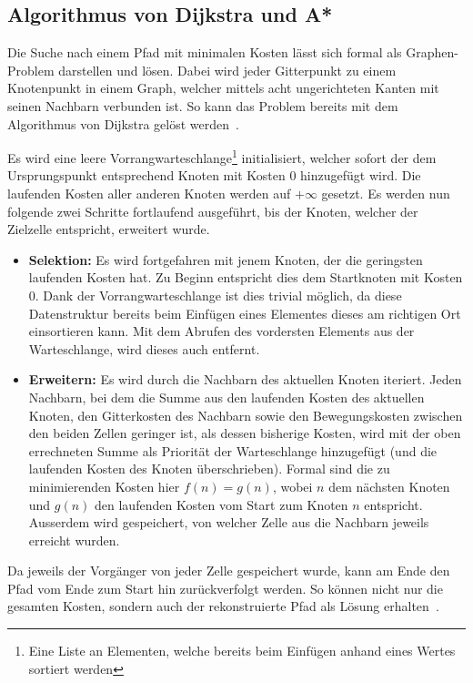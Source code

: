 \subsection{Algorithmus von Dijkstra und A*}

Die Suche nach einem Pfad mit minimalen Kosten lässt sich formal als Graphen-Problem darstellen und lösen. Dabei wird jeder Gitterpunkt zu einem Knotenpunkt in einem Graph, welcher mittels acht ungerichteten Kanten mit seinen Nachbarn verbunden ist. So kann das Problem bereits mit dem Algorithmus von Dijkstra gelöst werden~\cite{dijkstra1959note}.

Es wird eine leere Vorrangwarteschlange\footnote{Eine Liste an Elementen, welche bereits beim Einfügen anhand eines Wertes sortiert werden} initialisiert, welcher sofort der dem Ursprungspunkt entsprechend Knoten mit Kosten 0 hinzugefügt wird. Die laufenden Kosten aller anderen Knoten werden auf $+ \infty$ gesetzt. Es werden nun  folgende zwei Schritte fortlaufend ausgeführt, bis der Knoten, welcher der Zielzelle entspricht, erweitert wurde.~\cite{dijkstra1959note}
\begin{itemize}
  \item \textbf{Selektion:} Es wird fortgefahren mit jenem Knoten, der die geringsten laufenden Kosten hat. Zu Beginn entspricht dies dem Startknoten mit Kosten 0. Dank der Vorrangwarteschlange ist dies trivial möglich, da diese Datenstruktur bereits beim Einfügen eines Elementes dieses am richtigen Ort einsortieren kann. Mit dem Abrufen des vordersten Elements aus der Warteschlange, wird dieses auch entfernt.~\cite{dijkstra1959note}
  \item \textbf{Erweitern:} Es wird durch die Nachbarn des aktuellen Knoten iteriert. Jeden Nachbarn, bei dem die Summe aus den laufenden Kosten des aktuellen Knoten, den Gitterkosten des Nachbarn sowie den Bewegungskosten zwischen den beiden Zellen geringer ist, als dessen bisherige Kosten, wird mit der oben errechneten Summe als Priorität der Warteschlange hinzugefügt (und die laufenden Kosten des Knoten überschrieben). Formal sind die zu minimierenden Kosten hier $f(n)=g(n)$, wobei $n$ dem nächsten Knoten und $g(n)$ den laufenden Kosten vom Start zum Knoten $n$ entspricht. Ausserdem wird gespeichert, von welcher Zelle aus die Nachbarn jeweils erreicht wurden.~\cite{dijkstra1959note}
\end{itemize}

Da jeweils der Vorgänger von jeder Zelle gespeichert wurde, kann am Ende den Pfad vom Ende zum Start hin zurückverfolgt werden. So können nicht nur die gesamten Kosten, sondern auch der rekonstruierte Pfad als Lösung erhalten~\cite{dijkstra1959note}.

